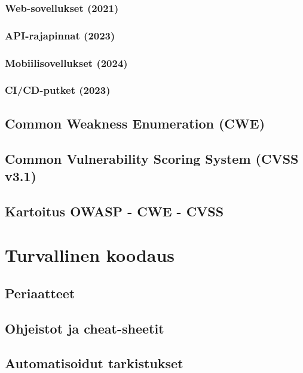 \documentclass[bscthesis,finnish,oneside,biblatex]{uefcsthesis}
\begin{document}
    \subsubsection{Web-sovellukset (2021)}   %
    \subsubsection{API-rajapinnat (2023)}     %
    \subsubsection{Mobiilisovellukset (2024)} %
    \subsubsection{CI/CD-putket (2023)}       %

  \subsection{Common Weakness Enumeration (CWE)}
  \subsection{Common Vulnerability Scoring System (CVSS v3.1)}
  \subsection{Kartoitus OWASP - CWE - CVSS}

\section{Turvallinen koodaus}
\label{sec:secure-code}
  \subsection{Periaatteet}
  \subsection{Ohjeistot ja cheat-sheetit}
  \subsection{Automatisoidut tarkistukset}

\end{document}

